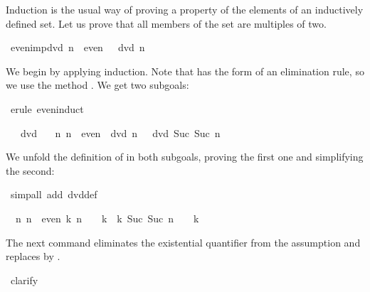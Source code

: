 \begin{isabellebody}
\begin{isamarkuptext}
Induction is the usual way of proving a property of the elements of an
inductively defined set.  Let us prove that all members of the set
 are multiples of two.%
\end{isamarkuptext}%
\isamarkuptrue%
\isamarkupfalse%
\ even{\isacharunderscore}imp{\isacharunderscore}dvd{\isacharcolon}\ {\isachardoublequoteopen}n\ {\isasymin}\ even\ {\isasymLongrightarrow}\ {}\ dvd\ n{\isachardoublequoteclose}%
\isadelimproof
%
\endisadelimproof
%
\isatagproof
%
\begin{isamarkuptxt}%
We begin by applying induction.  Note that  has the form
of an elimination rule, so we use the method .  We get two
subgoals:%
\end{isamarkuptxt}%
\isamarkuptrue%
\isamarkupfalse%
\ {\isacharparenleft}erule\ even{\isachardot}induct{\isacharparenright}%
\begin{isamarkuptxt}%
\begin{isabelle}%
\ {}{\isachardot}\ {}\ dvd\ {}\isanewline
\ {}{\isachardot}\ {\isasymAnd}n{\isachardot}\ {\isasymlbrakk}n\ {\isasymin}\ even{\isacharsemicolon}\ {}\ dvd\ n{\isasymrbrakk}\ {\isasymLongrightarrow}\ {}\ dvd\ Suc\ {\isacharparenleft}Suc\ n{\isacharparenright}%
\end{isabelle}
We unfold the definition of  in both subgoals, proving the first
one and simplifying the second:%
\end{isamarkuptxt}%
\isamarkuptrue%
\isamarkupfalse%
\ {\isacharparenleft}simp{\isacharunderscore}all\ add{\isacharcolon}\ dvd{\isacharunderscore}def{\isacharparenright}%
\begin{isamarkuptxt}%
\begin{isabelle}%
\ {}{\isachardot}\ {\isasymAnd}n{\isachardot}\ {\isasymlbrakk}n\ {\isasymin}\ even{\isacharsemicolon}\ {\isasymexists}k{\isachardot}\ n\ {\isacharequal}\ {}\ {\isacharasterisk}\ k{\isasymrbrakk}\ {\isasymLongrightarrow}\ {\isasymexists}k{\isachardot}\ Suc\ {\isacharparenleft}Suc\ n{\isacharparenright}\ {\isacharequal}\ {}\ {\isacharasterisk}\ k%
\end{isabelle}
The next command eliminates the existential quantifier from the assumption
and replaces  by .%
\end{isamarkuptxt}%
\isamarkuptrue%
\isamarkupfalse%
\ clarify%

\end{isabellebody}
